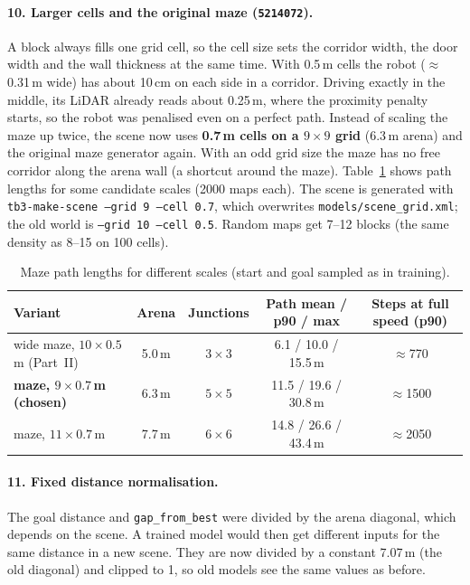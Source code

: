 \documentclass[11pt,a4paper]{article}
\newcommand{\code}[1]{\texttt{#1}}
\begin{document}
\paragraph{10. Larger cells and the original maze (\code{5214072}).}
A block always fills one grid cell, so the cell size sets the corridor width,
the door width and the wall thickness at the same time. With 0.5\,m cells
the robot ($\approx$0.31\,m wide) has about 10\,cm on each side in a
corridor. Driving exactly in the middle, its LiDAR already reads about
0.25\,m, where the proximity penalty starts, so the robot was penalised even
on a perfect path. Instead of scaling the maze up twice, the scene now uses
\textbf{0.7\,m cells on a $9\times9$ grid} (6.3\,m arena) and the original
maze generator again. With an odd grid size the maze has no free corridor
along the arena wall (a shortcut around the maze). Table~\ref{tab:mazesize}
shows path lengths for some candidate scales (2000 maps each). The scene is
generated with \code{tb3-make-scene --grid 9 --cell 0.7}, which overwrites
\code{models/scene\_grid.xml}; the old world is \code{--grid 10 --cell 0.5}.
Random maps get 7--12 blocks (the same density as 8--15 on 100 cells).

\begin{table}[H]
      \centering\small
      \begin{tabular}{@{}l c c c c@{}}
            \toprule
            Variant                                  & Arena          & Junctions        & Path mean / p90 / max  & Steps at full speed (p90) \\
            \midrule
            wide maze, $10\times0.5$\,m (Part~II)    & 5.0\,m         & $3\times3$       & 6.1 / 10.0 / 15.5\,m   & $\approx$770              \\
            \textbf{maze, $9\times0.7$\,m (chosen)}  & 6.3\,m         & $5\times5$       & 11.5 / 19.6 / 30.8\,m  & $\approx$1500             \\
            maze, $11\times0.7$\,m                   & 7.7\,m         & $6\times6$       & 14.8 / 26.6 / 43.4\,m  & $\approx$2050             \\
            \bottomrule
      \end{tabular}
      \caption{Maze path lengths for different scales (start and goal sampled as in training).}
      \label{tab:mazesize}
\end{table}

\paragraph{11. Fixed distance normalisation.} The goal distance and
\code{gap\_from\_best} were divided by the arena diagonal, which depends on
the scene. A trained model would then get different inputs for the same
distance in a new scene. They are now divided by a constant 7.07\,m (the old
diagonal) and clipped to 1, so old models see the same values as before.
\end{document}
